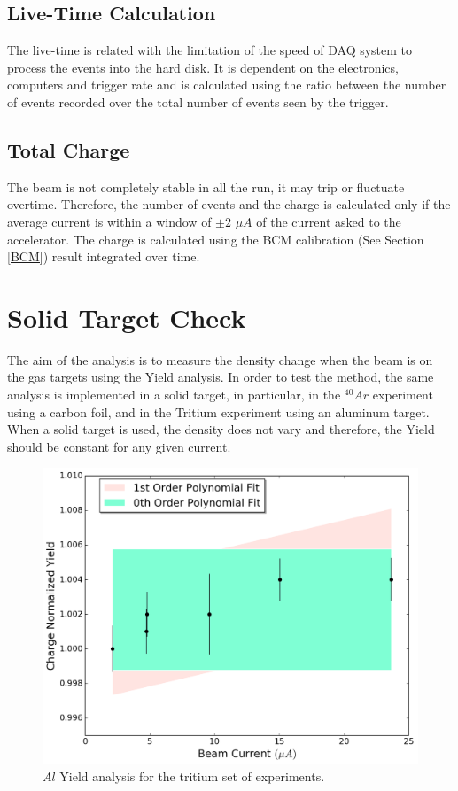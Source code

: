 \documentclass[final,5p,times,twocolumn]{elsarticle}
\begin{document}
\subsection{Live-Time Calculation } 

The live-time is related with the limitation of the speed of DAQ system to process the events into the hard disk. It is dependent on the electronics, computers and trigger rate and is calculated using the ratio between the number of events recorded over the total number of events seen by the trigger. 



\subsection{ Total Charge}

The beam is not completely stable in all the run, it may trip or fluctuate overtime. Therefore, the number of events and the charge is calculated only if the average current is within a window of $\pm 2$ $\mu A$ of the current asked to the accelerator.  The charge is calculated using the BCM calibration (See Section \ref{BCM}) result integrated over time.


\section{Solid Target Check}

The aim of the analysis is to measure the density change when the beam is on the gas targets using the Yield analysis. In order to test the method, the same analysis is implemented in a solid target, in particular, in the $^{40}Ar$ experiment using a carbon foil, and in the Tritium experiment using an aluminum target. When a solid target is used, the density does not vary and therefore, the Yield should be constant for any given current.

\begin{figure}[htbp]
    \centering
    \includegraphics[width=\linewidth]{images/solid_target.pdf}
    \caption{$Al$ Yield analysis for the tritium set of experiments.}
    \label{fig:solid}
\end{figure}
\end{document}
